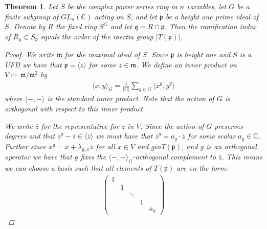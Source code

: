 \documentclass[11pt, a4paper, english]{article}
\newtheorem{theorem}{Theorem}[section]
\theoremstyle{definition}
\newcommand{\C}{\mathbb{C}}
\begin{document}
\begin{theorem}
\label{thm:ramification_index_equals_order_of_inertia_group}
Let $S$ be the complex power series ring in $n$ variables, let $G$ be  a finite subgroup of $GL_n(\C)$ acting on $S$, and let $\mathfrak{p}$ be a height one prime ideal of $S$. Denote by $R$ the fixed ring $S^G$ and let $\mathfrak{q} = R \cap \mathfrak{p}$. Then the ramification index of $R_\mathfrak{q} \subset S_\mathfrak{p}$ equals the order of the inertia group $|T(\mathfrak{p})|$.

\begin{proof}
We write $\mathfrak{m}$ for the maximal ideal of $S$. Since $\mathfrak{p}$ is height one and $S$ is a UFD we have that $\mathfrak{p} = \langle z \rangle$ for some $z \in \mathfrak{m}$. We define an inner product on $V := \mathfrak{m}/\mathfrak{m}^2$ by
\begin{align*}
\langle x, y \rangle_G = \frac{1}{|G|} \sum_{g \in G} \langle x^g,  y^g \rangle
\end{align*}
where $\langle -,- \rangle$ is the standard inner product. Note that the action of $G$ is orthogonal with respect to this inner product.

We write $\overline{z}$ for the representative for $z$ in $V$. Since the action of $G$ preserves degrees and that $\overline{z}^g - \overline{z} \in \langle \overline{z} \rangle$ we must have that $\overline{z}^g = a_g \cdot \overline{z}$ for some scalar $a_g \in \C$. Further since $x^g = x + \lambda_{g,x}\overline{z}$ for all $x \in V$ and $g in T(\mathfrak{p})$, and $g$ is an orthogonal operator we have that $g$ fixes the $\langle -,- \rangle_G$-orthogonal complement to $\overline{z}$. This means we can choose a basis such that all elements of $T(\mathfrak{p})$ are on the form:
\begin{align*}
\begin{pmatrix}
1\\
& 1\\
&& \ddots\\
&&&1\\
&&&& a_g
\end{pmatrix}
\end{align*}


\end{proof}
\end{theorem}
\end{document}
